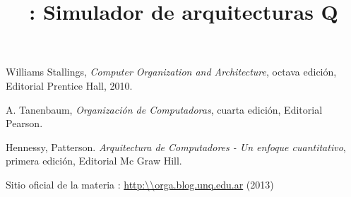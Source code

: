 \documentclass[10pt,a4paper,draft]{book}
\author{\susi \and \tati}
\title{\qsim: Simulador de arquitecturas Q}
\begin{document}
\maketitle
\tableofcontents









\begin{thebibliography}{9}

 Williams Stallings, \emph{Computer Organization and Architecture}, octava edición, Editorial Prentice Hall, 2010.

 A. Tanenbaum, \emph{Organización de Computadoras}, cuarta edición, Editorial Pearson.

 Hennessy, Patterson. \emph{Arquitectura de Computadores - Un enfoque cuantitativo}, primera edición,  Editorial Mc Graw Hill.

 Sitio oficial de la materia \orga: \url{http:\\orga.blog.unq.edu.ar} (2013)




\end{thebibliography}
\end{document}
